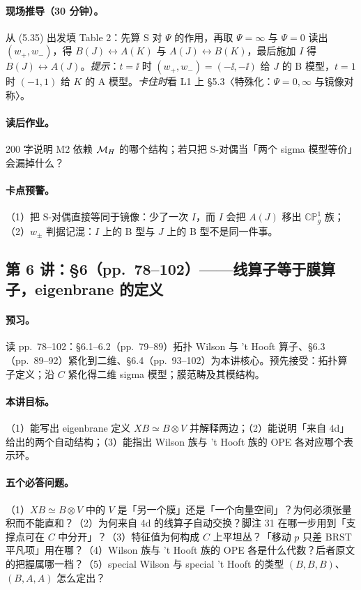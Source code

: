 {\paragraph{现场推导（30 分钟）。}从 (5.35) 出发填 Table 2：先算 S 对 \(\Psi\) 的作用，再取 \(\Psi=\infty\) 与 \(\Psi=0\) 读出 \((w_+,w_-)\)，得 \(B(J)\leftrightarrow A(K)\) 与 \(A(J)\leftrightarrow B(K)\)，最后施加 \(I\) 得 \(B(J)\leftrightarrow A(J)\)。\emph{提示}：\(t=\ii\) 时 \((w_+,w_-)=(-\ii,-\ii)\) 给 \(J\) 的 B 模型，\(t=1\) 时 \((-1,1)\) 给 \(K\) 的 A 模型。\emph{卡住时}看 L1 上 §5.3〈特殊化：\(\Psi=0,\infty\) 与镜像对称〉。\pC

\paragraph{读后作业。}200 字说明 M2 依赖 \(\mathcal{M}_H\) 的哪个结构；若只把 S-对偶当「两个 sigma 模型等价」会漏掉什么？\pC

\paragraph{卡点预警。}（1）把 S-对偶直接等同于镜像：少了一次 \(I\)，而 \(I\) 会把 \(A(J)\) 移出 \(\mathbb{CP}^1_g\) 族；（2）\(w_\pm\) 判据记混：\(I\) 上的 B 型与 \(J\) 上的 B 型不是同一件事。\pC

\subsection{第 6 讲：\S6（pp.~78--102）——线算子等于膜算子，eigenbrane 的定义}

\paragraph{预习。}读 pp.~78--102：§6.1--6.2（pp.~79--89）拓扑 Wilson 与 't Hooft 算子、§6.3（pp.~89--92）紧化到二维、§6.4（pp.~93--102）为本讲核心。预先接受：拓扑算子定义；沿 \(C\) 紧化得二维 sigma 模型；膜范畴及其模结构。\pC

\paragraph{本讲目标。}（1）能写出 eigenbrane 定义 \(XB\simeq B\otimes V\) 并解释两边；（2）能说明「来自 4d」给出的两个自动结构；（3）能指出 Wilson 族与 't Hooft 族的 OPE 各对应哪个表示环。\pC

\paragraph{五个必答问题。}（1）\(XB\simeq B\otimes V\) 中的 \(V\) 是「另一个膜」还是「一个向量空间」？为何必须张量积而不能直和？（2）为何来自 4d 的线算子自动交换？脚注 31 在哪一步用到「支撑点可在 \(C\) 中分开」？（3）特征值为何构成 \(C\) 上平坦丛？「移动 \(p\) 只差 BRST 平凡项」用在哪？（4）Wilson 族与 't Hooft 族的 OPE 各是什么代数？后者原文的把握属哪一档？（5）special Wilson 与 special 't Hooft 的类型 \((B,B,B)\)、\((B,A,A)\) 怎么定出？\pC

}
